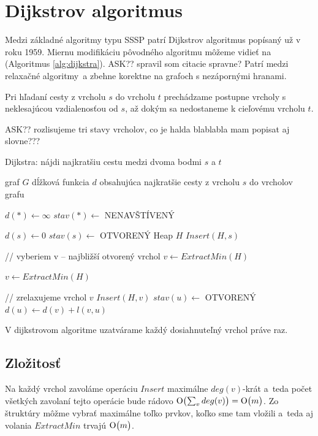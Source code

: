 \section{Dijkstrov algoritmus}
Medzi základné algoritmy typu SSSP patrí Dijkstrov algoritmus \cite{dijkstra59} popísaný už v roku 1959. 
Miernu modifikáciu pôvodného algoritmu môžeme vidieť na (Algoritmus \ref{alg:dijkstra}).  ASK?? spravil som citacie spravne?
Patrí medzi relaxačné algoritmy~a zbehne korektne na grafoch
s nezápornými hranami.

Pri hľadaní cesty z vrcholu $s$ do vrcholu $t$ prechádzame postupne vrcholy s neklesajúcou vzdialenosťou od $s$, až dokým sa nedostaneme k cieľovému vrcholu $t$.


ASK?? rozlisujeme tri stavy vrcholov, co je halda blablabla mam popisat aj slovne???

\begin{algorithm}
\caption{Dijkstra: nájdi najkratšiu cestu medzi dvoma bodmi $s$ a $t$}
\label{alg:dijkstra}
\begin{algorithmic}[1] %
\REQUIRE graf $G$
\ENSURE dĺžková funkcia $d$ obsahujúca najkratšie cesty  z vrcholu $s$ do vrcholov grafu


\STATE $ d(*) \leftarrow \infty $
\STATE $ stav(*) \leftarrow$ NENAVŠTÍVENÝ

\STATE $d(s) \leftarrow 0$
\STATE $stav(s) \leftarrow $ OTVORENÝ
\STATE Heap $H$
\STATE $Insert(H, s)$

	
	\STATE // vyberiem v -- najbližší otvorený vrchol
	\STATE $v \leftarrow ExtractMin(H)$
	
		\STATE $v \leftarrow ExtractMin(H)$
	\ENDWHILE
	
	\STATE // zrelaxujeme vrchol $v$
			\STATE $Insert(H, v)$
			\STATE $stav(u) \leftarrow$ OTVORENÝ
			\STATE $d(u) \leftarrow d(v) + l(v, u)$
			
		\ENDIF
	\ENDFOR
\ENDWHILE

\end{algorithmic}
\end{algorithm}

\begin{theorem}
V dijkstrovom algoritme uzatvárame každý dosiahnuteľný vrchol práve raz.
\end{theorem}


\subsection{Zložitosť}
Na každý vrchol zavoláme operáciu $Insert$ maximálne $deg(v)$-krát a~teda počet všetkých zavolaní tejto operácie bude rádovo $\operatorname{O}\bigl(\sum_{v}{deg(v)}\bigr) = \operatorname{O}\bigl(m\bigr)$.
Zo štruktúry môžme vybrať maximálne toľko prvkov, koľko sme tam vložili a~teda aj volania $ExtractMin$ trvajú $\operatorname{O}\bigl(m\bigr)$.

